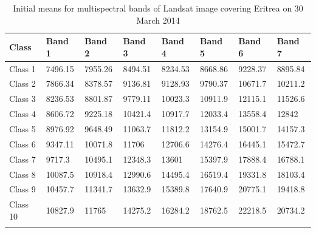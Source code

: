 \documentclass[sn-mathphys-num]{sn-jnl}%
\theoremstyle{thmstyleone}%
\theoremstyle{thmstyletwo}%
\theoremstyle{thmstylethree}%
\begin{document}
\vspace{-3pt}
\begin{table}[ht]
\caption{Initial means for multispectral bands of Landsat image covering Eritrea on 30 March 2014}
\begin{tabular}{@{}llllllll@{}}
\toprule 
\textbf{Class} & \textbf{Band 1} & \textbf{Band 2} & \textbf{Band 3} & \textbf{Band 4} & \textbf{Band 5} & \textbf{Band 6} & \textbf{Band 7} \\  \midrule
    Class 1 & 7496.15 & 7955.26 & 8494.51 & 8234.53 & 8668.86 & 9228.37 &8895.84 \\
    Class 2 & 7866.34 & 8378.57 & 9136.81 & 9128.93 & 9790.37 & 10671.7 & 10211.2 \\
    Class 3 & 8236.53 & 8801.87 & 9779.11 & 10023.3 & 10911.9 & 12115.1 & 11526.6 \\
    Class 4 & 8606.72 & 9225.18 & 10421.4 & 10917.7 & 12033.4 & 13558.4 & 12842\\
    Class 5 & 8976.92 & 9648.49 & 11063.7 & 11812.2 & 13154.9 & 15001.7 & 14157.3 \\
    Class 6 & 9347.11 & 10071.8 & 11706 & 12706.6 & 14276.4 & 16445.1 & 15472.7\\
    Class 7 & 9717.3 & 10495.1 & 12348.3 & 13601 & 15397.9 & 17888.4 & 16788.1 \\
    Class 8 & 10087.5 & 10918.4 & 12990.6 & 14495.4 & 16519.4 &19331.8 & 18103.4 \\
    Class 9 & 10457.7 & 11341.7 & 13632.9 & 15389.8 & 17640.9 & 20775.1 & 19418.8 \\
    Class 10 & 10827.9 & 11765 & 14275.2 & 16284.2 & 18762.5 & 22218.5 & 20734.2 \\
    \botrule
\end{tabular}
\label{AppB}
\end{table}
\end{document}

